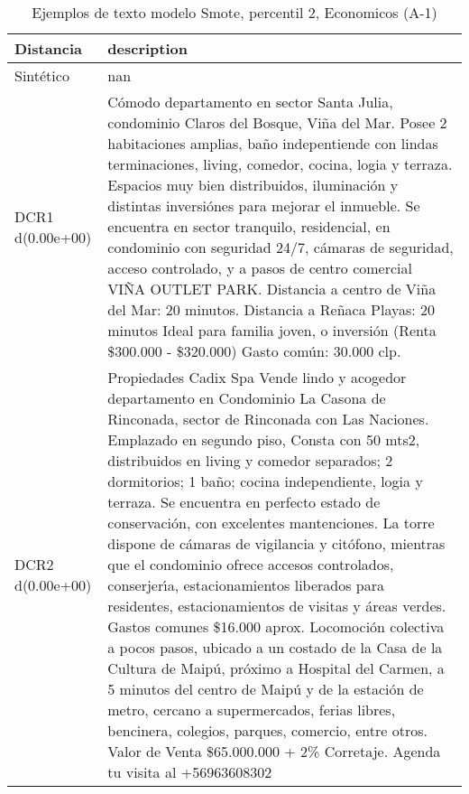 \begin{table}[H]
\centering
\fontsize{10}{14}\selectfont
\caption{Ejemplos de texto modelo Smote, percentil 2, Economicos (A-1)}
\label{table-example-economicos-a-1-smote-enc-2p-text}
\begin{tabular}{|l|m{35em}|}
\hline
\rowcolor[gray]{0.8}
Distancia & description \\
\hline Sintético & nan \\
\hline DCR1 d(0.00e+00) & C\'omodo departamento en sector Santa Julia, condominio Claros del Bosque, Vi\~na del Mar. Posee 2 habitaciones amplias, ba\~no indepentiende con lindas terminaciones, living, comedor, cocina, logia y terraza. Espacios muy bien distribuidos, iluminaci\'on y distintas inversi\'ones para mejorar el inmueble. Se encuentra en sector tranquilo, residencial, en condominio con seguridad 24/7, c\'amaras de seguridad, acceso controlado, y a pasos de centro comercial VI\~NA OUTLET PARK. Distancia a centro de Vi\~na del Mar: 20 minutos. Distancia a Re\~naca Playas: 20 minutos Ideal para familia joven, o inversi\'on (Renta \$300.000 - \$320.000) Gasto com\'un: 30.000 clp. \\
\hline DCR2 d(0.00e+00) & Propiedades Cadix Spa Vende lindo y acogedor departamento en Condominio La Casona de Rinconada, sector de Rinconada con Las Naciones. Emplazado en segundo piso, Consta con 50 mts2, distribuidos en living y comedor separados; 2 dormitorios; 1 ba\~no; cocina independiente, logia y terraza. Se encuentra en perfecto estado de conservaci\'on, con excelentes mantenciones. La torre dispone de c\'amaras de vigilancia y cit\'ofono, mientras que el condominio ofrece accesos controlados, conserjer{\'\i}a, estacionamientos liberados para residentes, estacionamientos de visitas y \'areas verdes. Gastos comunes \$16.000 aprox. 
Locomoci\'on colectiva a pocos pasos, ubicado a un costado de la Casa de la Cultura de Maip\'u, pr\'oximo a Hospital del Carmen, a 5 minutos del centro de Maip\'u y de la estaci\'on de metro, cercano a supermercados, ferias libres, bencinera, colegios, parques, comercio, entre otros.
Valor de Venta \$65.000.000 + 2\% Corretaje. Agenda tu visita al +56963608302 \\
\hline
\end{tabular}
\end{table}
